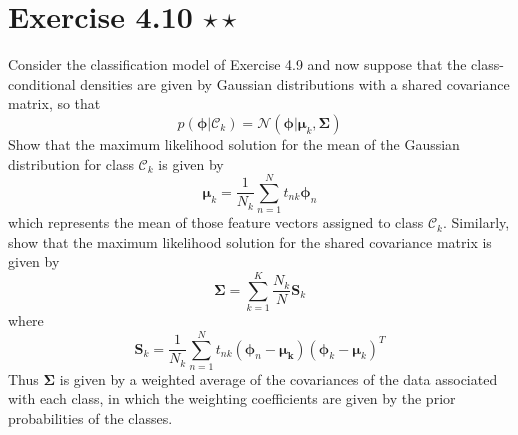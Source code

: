 \section*{Exercise 4.10 $\star \star$}
Consider the classification model of Exercise 4.9 and now suppose
that the class-conditional densities are given by Gaussian 
distributions with a shared covariance matrix, so that
\begin{equation}\label{eq:4.160}\tag{4.160}
    p(\bm{\phi} | \mathcal{C}_k) = \mathcal{N}(\bm{\phi} | \bm{\mu}_k, \mathbf{\Sigma})
\end{equation}
Show that the maximum likelihood solution for the mean of the
Gaussian distribution for class $\mathcal{C}_k$ is given by
\begin{equation}\label{eq:4.161}\tag{4.161}
    \bm{\mu}_k = \frac{1}{N_k} \sum_{n=1}^{N} t_{nk} \bm{\phi}_n
\end{equation}
which represents the mean of those feature vectors assigned
to class $\mathcal{C}_k$. Similarly, show that the maximum likelihood
solution for the shared covariance matrix is given by
\begin{equation}\label{eq:4.162}\tag{4.162}
    \mathbf{\Sigma} = \sum_{k=1}^{K} \frac{N_k}{N}\mathbf{S}_k
\end{equation}
where 
\begin{equation}\label{eq:4.163}\tag{4.163}
\mathbf{S}_k = \frac{1}{N_k} \sum_{n=1}^{N} 
t_{nk}(\bm{\phi}_n - \bm{\mu_k})(\bm{\phi}_{k} - \bm{\mu}_k)^T
\end{equation}
Thus $\mathbf{\Sigma}$ is given by a weighted average of the covariances
of the data associated with each class, in which the weighting coefficients
are given by the prior probabilities of the classes.

\vspace{1em}

